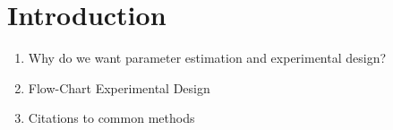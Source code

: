 \documentclass[10pt,A4paper]{article}
\begin{document}
\section*{Introduction}
%
\begin{enumerate}
	\item Why do we want parameter estimation and experimental design?
	\item Flow-Chart Experimental Design
	\item Citations to common methods
\end{enumerate}
\end{document}

